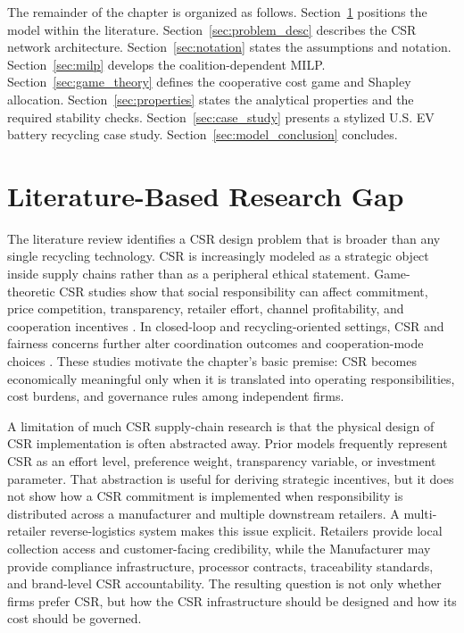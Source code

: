 The remainder of the chapter is organized as follows. Section~\ref{sec:ch4_literature_gap} positions the model within the literature. Section~\ref{sec:problem_desc} describes the CSR network architecture. Section~\ref{sec:notation} states the assumptions and notation. Section~\ref{sec:milp} develops the coalition-dependent MILP. Section~\ref{sec:game_theory} defines the cooperative cost game and Shapley allocation. Section~\ref{sec:properties} states the analytical properties and the required stability checks. Section~\ref{sec:case_study} presents a stylized U.S. EV battery recycling case study. Section~\ref{sec:model_conclusion} concludes.

\section{Literature-Based Research Gap}
\label{sec:ch4_literature_gap}

The literature review identifies a CSR design problem that is broader than any single recycling technology. CSR is increasingly modeled as a strategic object inside supply chains rather than as a peripheral ethical statement. Game-theoretic CSR studies show that social responsibility can affect commitment, price competition, transparency, retailer effort, channel profitability, and cooperation incentives \cite{Buccella2024,FantiBuccella2017,Ferrara2017,Khosroshahi2019,Mahdiraji2023}. In closed-loop and recycling-oriented settings, CSR and fairness concerns further alter coordination outcomes and cooperation-mode choices \cite{ZhangLiang2023,ZhengB2022}. These studies motivate the chapter's basic premise: CSR becomes economically meaningful only when it is translated into operating responsibilities, cost burdens, and governance rules among independent firms.

A limitation of much CSR supply-chain research is that the physical design of CSR implementation is often abstracted away. Prior models frequently represent CSR as an effort level, preference weight, transparency variable, or investment parameter. That abstraction is useful for deriving strategic incentives, but it does not show how a CSR commitment is implemented when responsibility is distributed across a manufacturer and multiple downstream retailers. A multi-retailer reverse-logistics system makes this issue explicit. Retailers provide local collection access and customer-facing credibility, while the Manufacturer may provide compliance infrastructure, processor contracts, traceability standards, and brand-level CSR accountability. The resulting question is not only whether firms prefer CSR, but how the CSR infrastructure should be designed and how its cost should be governed.

